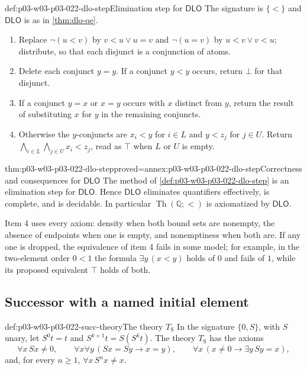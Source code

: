 \begin{hbmethod}{def:p03-w03-p03-022-dlo-step}{Elimination step for \(\mathsf{DLO}\)}
The signature is \(\{<\}\) and \(\mathsf{DLO}\) is as in
\cref{thm:dlo-qe}.
\begin{enumerate}
\item Replace \(\neg(u<v)\) by \(v<u\lor u=v\) and \(\neg(u=v)\) by
  \(u<v\lor v<u\); distribute, so that each disjunct is a conjunction of
  atoms.
\item Delete each conjunct \(y=y\). If a conjunct \(y<y\) occurs, return
  \(\bot\) for that disjunct.
\item If a conjunct \(y=x\) or \(x=y\) occurs with \(x\) distinct from
  \(y\), return the result of substituting \(x\) for \(y\) in the
  remaining conjuncts.
\item Otherwise the \(y\)-conjuncts are \(x_i<y\) for \(i\in L\) and
  \(y<z_j\) for \(j\in U\). Return
  \(\bigwedge_{i\in L}\bigwedge_{j\in U}x_i<z_j\), read as \(\top\) when
  \(L\) or \(U\) is empty.
\end{enumerate}
\end{hbmethod}

\begin{hbtheorem}{thm:p03-w03-p03-022-dlo-step}{proved=annex:p03-w03-p03-022-dlo-step}{Correctness and consequences for \(\mathsf{DLO}\)}
The method of \cref{def:p03-w03-p03-022-dlo-step} is an elimination step
for \(\mathsf{DLO}\). Hence \(\mathsf{DLO}\) eliminates quantifiers
effectively, is complete, and is decidable. In particular
\(\operatorname{Th}(\mathbb Q;<)\) is axiomatized by \(\mathsf{DLO}\).
\end{hbtheorem}

Item 4 uses every axiom: density when both bound sets are nonempty, the
absence of endpoints when one is empty, and nonemptiness when both are. If
any one is dropped, the equivalence of item 4 fails in some model; for
example, in the two-element order \(0<1\) the formula \(\exists y\,(x<y)\)
holds of \(0\) and fails of \(1\), while its proposed equivalent \(\top\)
holds of both.

\subsection{Successor with a named initial element}

\begin{hbdefinition}{def:p03-w03-p03-022-succ-theory}{The theory \(T_{\mathrm S}\)}
In the signature \(\{0,S\}\), with \(S\) unary, let \(S^0t=t\) and
\(S^{k+1}t=S(S^kt)\). The theory \(T_{\mathrm S}\) has the axioms
\[
 \forall x\,S x\ne 0,\qquad
 \forall x\forall y\,(Sx=Sy\to x=y),\qquad
 \forall x\,(x\ne0\to\exists y\,Sy=x),
\]
and, for every \(n\ge1\), \(\forall x\,S^nx\ne x\).
\end{hbdefinition}

